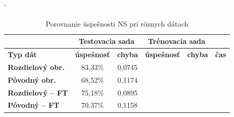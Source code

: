 \begin{table}[h]
\catcode` %
\centering
\begin{tabular}{|l|c|c|c|c|c|}
\cline{2-5}
\multicolumn{1}{l}{} & \multicolumn{2}{|c|}{\textbf{Testovacia sada}} & \multicolumn{2}{c|}{\textbf{Trénovacia sada}} & \multicolumn{1}{l}{}\\ 
\hline
\textbf{Typ dát} & \textbf{úspešnosť} & \textbf{chyba} & \textbf{úspešnosť} & \textbf{chyba} & \textbf{čas} \\ \hline
\textbf{Rozdielový obr.} & 83,33\% & 0,0745 & & & \\ \hline
\textbf{Pôvodný obr.} & 68,52\% & 0,1174& & &\\ \hline
\textbf{Rozdielový -- FT} & 75,18\%& 0,0895& & &\\ \hline
\textbf{Pôvodný -- FT} & 70.37\%& 0,1158& & &\\
\hline
\end{tabular}
\caption{Porovnanie úspešnosti NS pri rôznych dátach}
\label{tab:neuraldatacmp}
\end{table}